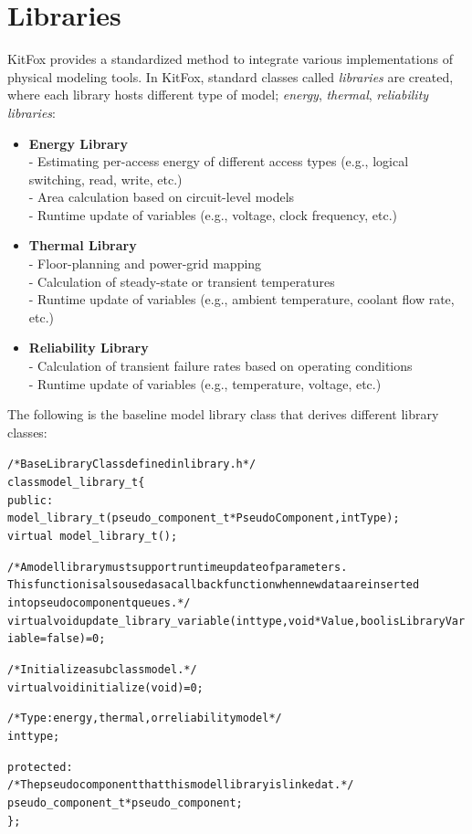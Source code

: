 \section{Libraries} \label{sec:libraries}
\noindent
KitFox provides a standardized method to integrate various implementations of physical modeling tools.
In KitFox, standard classes called \emph{libraries} are created, where each library hosts different type of model; \emph{energy}, \emph{thermal}, \emph{reliability libraries}:
\begin{itemize}
\item{\textbf{Energy Library}\\
- Estimating per-access energy of different access types (e.g., logical switching, read, write, etc.)\\
- Area calculation based on circuit-level models\\
- Runtime update of variables (e.g., voltage, clock frequency, etc.)} 
\item{\textbf{Thermal Library}\\
- Floor-planning and power-grid mapping\\
- Calculation of steady-state or transient temperatures\\
- Runtime update of variables (e.g., ambient temperature, coolant flow rate, etc.)} 
\item{\textbf{Reliability Library}\\
- Calculation of transient failure rates based on operating conditions\\
- Runtime update of variables (e.g., temperature, voltage, etc.)}
\end{itemize} 

\noindent
The following is the baseline model library class that derives different library classes:
{
\fontsize{10pt}{11pt}\selectfont
\begin{alltt}
/* Base Library Class defined in library.h */
class model_library_t \{
public:
    model_library_t(pseudo_component_t *PseudoComponent, int Type);
    virtual ~model_library_t();

    /* A model library must support runtime update of parameters.
       This function is also used as a callback function when new data are inserted
       into pseudo component queues. */
    virtual void update_library_variable(int type, void *Value, bool isLibraryVariable=false)=0;

    /* Initialize a subclass model. */
    virtual void initialize(void)=0;

    /* Type: energy, thermal, or reliability model */
    int type;

protected:
    /* The pseudo component that this model library is linked at. */
    pseudo_component_t *pseudo_component;
\};
\end{alltt}
}

